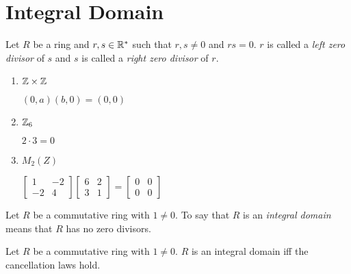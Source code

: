 \documentclass[letterpaper,12pt,fleqn]{article}
\begin{document}
\section*{Integral Domain}

\begin{definition}
  Let $R$ be a ring and $r,s\in\mathbb{R}^*$ such that $r,s\ne0$ and  $rs=0$. $r$ is
  called a \emph{left zero divisor} of $s$ and $s$ is called a
  \emph{right zero divisor} of $r$.
\end{definition}

\begin{example}
  \listbreak
  \begin{enumerate}
  \item $\mathbb{Z}\times\mathbb{Z}$

    $(0,a)(b,0)=(0,0)$

  \item $\mathbb{Z}_6$

    $2\cdot3=0$

  \item $M_2(Z)$

    $\begin{bmatrix} 1 & -2 \\ -2 & 4 \end{bmatrix}
    \begin{bmatrix} 6 & 2 \\ 3 & 1 \end{bmatrix}=
    \begin{bmatrix} 0 & 0 \\ 0 & 0 \end{bmatrix}$
  \end{enumerate}
\end{example}

\begin{definition}
  Let $R$ be a commutative ring with $1\ne0$. To say that $R$ is an
  \emph{integral domain} means that $R$ has no zero divisors.
\end{definition}

\begin{theorem}
  Let $R$ be a commutative ring with $1\ne0$. $R$ is an integral domain iff
  the cancellation laws hold.
\end{theorem}
\end{document}
